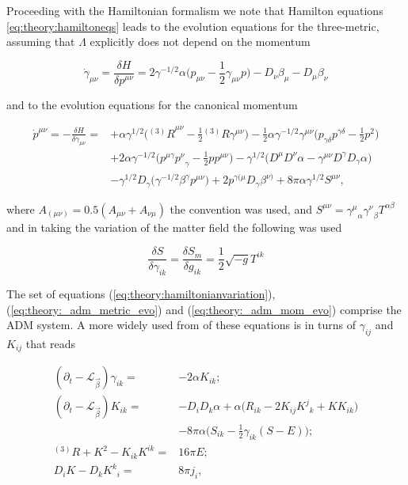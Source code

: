 \documentclass[11pt,a4paper,headinclude=true,DIV=14,BCOR=8mm,chapterprefix,listof=totoc,twoside,openright,abstracton]{scrbook}
\begin{document}
Proceeding with the Hamiltonian formalism we note that Hamilton equations \ref{eq:theory:hamiltoneqs} leads to the evolution equations for the three-metric, assuming that $\Lambda$ explicitly does not depend on the momentum

\begin{equation}
\dot{\gamma}_{\mu\nu} =\frac{\delta H}{\delta p^{\mu\nu}} = 2\gamma^{-1/2}\alpha\big(p_{\mu\nu}-\frac{1}{2}\gamma_{\mu\nu}p\big) - D_{\nu}\beta_{\mu}-D_{\mu}\beta_{\nu}
\label{eq:theory:_adm_metric_evo}
\end{equation}

and to the evolution equations for the canonical momentum 

\begin{align}
\dot{p}^{\mu\nu} = -\frac{\delta H}{\delta \gamma_{\mu\nu}} = &+ \alpha\gamma^{1/2}\Big({^{(3)}R}^{\mu\nu}-\frac{1}{2}{^{(3)}R\gamma^{\mu\nu}}\Big) 
 - \frac{1}{2}\alpha\gamma^{-1/2}\gamma^{\mu\nu}\Big(p_{\gamma\delta}p^{\gamma\delta}-\frac{1}{2}p^2\Big) \\
& + 2\alpha\gamma^{-1/2}\big(p^{\mu\gamma}{p^{\nu}}_{\gamma}-\frac{1}{2}pp^{\mu\nu}\big) 
 - \gamma^{1/2}\big(D^{\mu}D^{\nu}\alpha-\gamma^{\mu\nu}D^{\gamma}D_{\gamma}\alpha\big) \\
& - \gamma^{1/2}D_{\gamma}\big(\gamma^{-1/2}\beta^{\gamma}p^{\mu\nu}\big) 
+ 2p^{\gamma(\mu}D_{\gamma}\beta^{\nu)} + 8\pi \alpha \gamma^{1/2}S^{\mu\nu},
\label{eq:theory:_adm_mom_evo}
\end{align}

where $A_{(\mu\nu)} = 0.5(A_{\mu\nu}+A_{\nu\mu})$ the convention was used, and $S^{\mu\nu} = {\gamma^{\mu}}_{\alpha}{\gamma^{\nu}}_{\beta}T^{\alpha\beta}$ and in taking the variation of the matter field the following was used

\begin{equation}
\frac{\delta S}{\delta \gamma_{ik}} = \frac{\delta S_m}{\delta g_{ik}} = \frac{1}{2}\sqrt{-g}T^{ik}
\end{equation}

The set of equations (\ref{eq:theory:hamiltonianvariation}), (\ref{eq:theory:_adm_metric_evo}) and (\ref{eq:theory:_adm_mom_evo}) comprise the ADM system. A more widely used from of these equations is in turns of $\gamma_{ij}$ and $K_{ij}$ that reads

\begin{align}
(\partial_t - \mathcal{L}_{\vec{\beta}})\gamma_{ik} =& -2\alpha K_{ik}; \\
(\partial_t - \mathcal{L}_{\vec{\beta}})K_{ik} =& -D_{i}D_{k}\alpha + \alpha\big(R_{ik} - 2K_{ij}{K^j}_k+KK_{ik}\big) \\
&- 8\pi\alpha\Big(S_{ik} - \frac{1}{2}\gamma_{ik}(S-E)\Big); \\
{^{(3)}R} + K^2 - K_{ik}K^{ik} =& 16\pi E; \\
D_{i}K-D_{k}{K^k}_i =& 8\pi j_i,
\label{eq:theory:adm}
\end{align}
\end{document}

